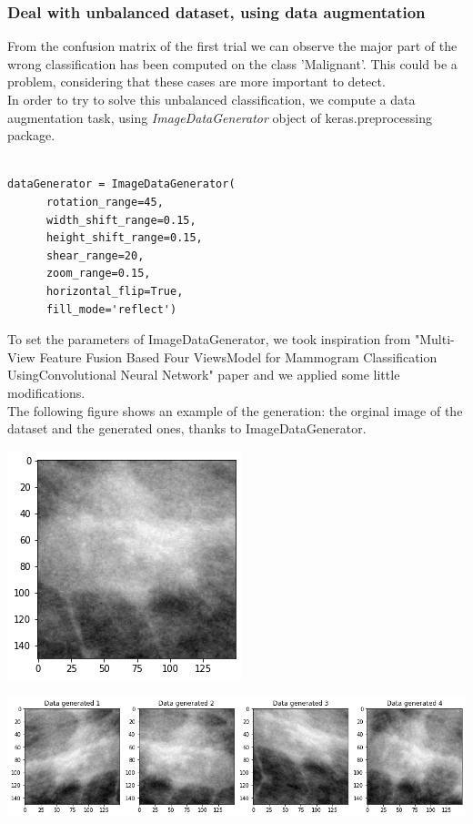 \documentclass{article}
\begin{document}
\subsubsection{Deal with unbalanced dataset, using data augmentation}
From the confusion matrix of the first trial we can observe the major part of the wrong classification has been computed on the class 'Malignant'. This could be a problem, considering that these cases are more important to detect.\\
In order to try to solve this unbalanced classification, we compute a data augmentation task, using \textit{ImageDataGenerator} object of keras.preprocessing package.

\begin{verbatim}

dataGenerator = ImageDataGenerator(
      rotation_range=45,
      width_shift_range=0.15,
      height_shift_range=0.15,
      shear_range=20,
      zoom_range=0.15,
      horizontal_flip=True,
      fill_mode='reflect')

\end{verbatim}
To set the parameters of ImageDataGenerator, we took inspiration from "Multi-View Feature Fusion Based Four ViewsModel for Mammogram Classification UsingConvolutional Neural Network" paper and we applied some little modifications.\\
The following figure shows an example of the generation: the orginal image of the dataset and the generated ones, thanks to ImageDataGenerator.
\begin{center}
\begin{minipage}{0.47\textwidth}
        \includegraphics[scale=0.6]{./img/dataOriginal.png}
    \end{minipage}
\end{center}


\begin{minipage}{0.01\textwidth}
        \includegraphics[scale=0.38]{./img/dataGen.png}
    \end{minipage}
\end{document}

